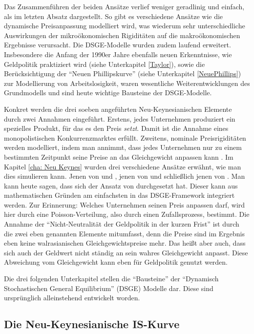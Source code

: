 Das Zusammenführen der beiden Ansätze verlief weniger geradlinig und einfach, als im letzten Absatz dargestellt. So gibt es verschiedene Ansätze \parencite[S. 310]{Romer2019} wie die dynamische Preisanpassung modelliert wird, was wiederum sehr unterschiedliche Auswirkungen der mikroökonomischen Rigiditäten auf die makroökonomischen Ergebnisse verursacht. Die DSGE-Modelle wurden zudem laufend erweitert. Insbesondere die Anfang der 1990er Jahre ebenfalls neuen Erkenntnisse, wie Geldpolitik praktiziert wird (siehe Unterkapitel \ref{Taylor}), sowie die Berücksichtigung der "`Neuen Phillipskurve"' (siehe Unterkapitel \ref{NeuePhillips}) zur Modellierung von Arbeitslosigkeit, waren wesentliche Weiterentwicklungen des Grundmodells und sind heute wichtige Bausteine der DSGE-Modelle.

Konkret werden die drei soeben angeführten Neu-Keynesianischen Elemente durch zwei Annahmen eingeführt. Erstens, jedes Unternehmen produziert ein spezielles Produkt, für das es den Preis \textit{setzt}. Damit ist die Annahme eines monopolistischen Konkurrenzmarktes erfüllt. Zweitens, nominale Preisrigiditäten werden modelliert, indem man annimmt, dass jedes Unternehmen nur zu einem bestimmten Zeitpunkt seine Preise an das Gleichgewicht anpassen kann \parencite[S. 52]{Gali2015}. Im Kapitel \ref{cha: Neu Keynes} wurden drei verschiedene Ansätze erwähnt, wie man dies simulieren kann. Jenen von \textcite{Fischer1977} und \textcite{Taylor1977}, jenen von \textcite{Taylor1979} und schließlich jenen von \textcite{Calvo1983}. Man kann heute sagen, dass sich der Ansatz von \textcite{Calvo1983} durchgesetzt hat. Dieser kann aus mathematischen Gründen am einfachsten in das DSGE-Framework integriert werden. Zur Erinnerung: Welches Unternehmen seinen Preis anpassen darf, wird hier durch eine Poisson-Verteilung, also durch einen Zufallsprozess, bestimmt. Die Annahme der "`Nicht-Neutralität der Geldpolitik in der kurzen Frist"' ist durch die zwei eben genannten Elemente mitumfasst, denn die Preise sind im Ergebnis eben keine walrasianischen Gleichgewichtspreise mehr. Das heißt aber auch, dass sich auch der Geldwert nicht ständig an sein wahres Gleichgewicht anpasst. Diese Abweichung vom Gleichgewicht kann eben für Geldpolitik genutzt werden.

Die drei folgenden Unterkapitel stellen die "`Bausteine"' der "`Dynamisch Stochastischen General Equilibrium"' (DSGE) Modelle dar. Diese sind ursprünglich alleinstehend entwickelt worden. 

\subsection{Die Neu-Keynesianische IS-Kurve}
\label{NeueIS}

